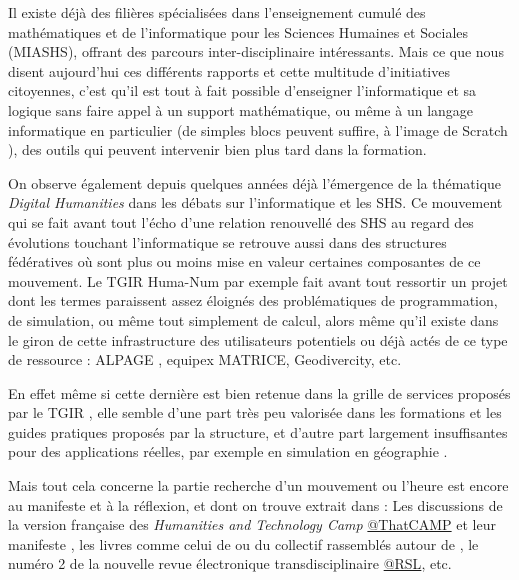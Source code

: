Il existe déjà des filières spécialisées dans l'enseignement cumulé des mathématiques et de l'informatique pour les Sciences Humaines et Sociales (MIASHS), offrant des parcours inter-disciplinaire intéressants. Mais ce que nous disent aujourd'hui ces différents rapports et cette multitude d'initiatives citoyennes, c'est qu'il est tout à fait possible d'enseigner l'informatique et sa logique sans faire appel à un support mathématique, ou même à un langage informatique en particulier (de simples blocs peuvent suffire, à l'image de Scratch \autocite{Resnick2009}), des outils qui peuvent intervenir bien plus tard dans la formation.

On observe également depuis quelques années déjà l'émergence de la thématique \textit{Digital Humanities} dans les débats sur l'informatique et les SHS. Ce mouvement  qui se fait avant tout l'écho d'une relation renouvellé des SHS au regard des évolutions touchant l'informatique  se retrouve aussi dans des structures fédératives où sont plus ou moins mise en valeur certaines composantes de ce mouvement. Le TGIR Huma-Num par exemple fait avant tout ressortir un projet dont les termes  paraissent assez éloignés des problématiques de programmation, de simulation, ou même tout simplement de calcul, alors même qu'il existe dans le giron de cette infrastructure des utilisateurs potentiels ou déjà actés de ce type de ressource : ALPAGE \autocite{Costa2012}, equipex MATRICE, Geodivercity, etc.

En effet même si cette dernière est bien retenue dans la grille de services proposés par le TGIR , elle semble d'une part très peu valorisée dans les formations et les guides pratiques proposés par la structure, et d'autre part largement insuffisantes pour des applications réelles, par exemple en simulation en géographie .

Mais tout cela concerne la partie recherche d'un mouvement ou l'heure est encore au manifeste et à la réflexion, et dont on trouve extrait dans : Les discussions de la version française des \textit{Humanities and Technology Camp} \href{http://tcp.hypotheses.org/}{@ThatCAMP} et leur manifeste \autocite{THATCamp2010}, les livres comme celui de \textcite{Deuff2014} ou du collectif rassemblés autour de \textcite{Mounier2012}, le numéro 2 de la nouvelle revue électronique transdisciplinaire \href{http://rsl.revues.org/355}{@RSL}, etc.

